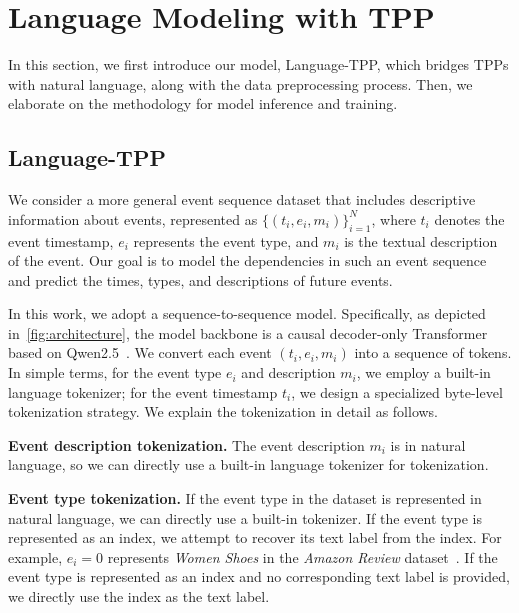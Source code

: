 \section{Language Modeling with TPP}
In this section, we first introduce our model, Language-TPP, which bridges TPPs with natural language, along with the data preprocessing process. Then, we elaborate on the methodology for model inference and training. 

\subsection{Language-TPP}
We consider a more general event sequence dataset that includes descriptive information about events, represented as \(\{(t_i, e_i, m_i)\}_{i=1}^N\), where \(t_i\) denotes the event timestamp, \(e_i\) represents the event type, and \(m_i\) is the textual description of the event. 
Our goal is to model the dependencies in such an event sequence and predict the times, types, and descriptions of future events. 


In this work, we adopt a sequence-to-sequence model. Specifically, as depicted in~\cref{fig:architecture}, the model backbone is a causal decoder-only Transformer based on Qwen2.5~\citep{yang2024qwen2}. 
We convert each event $(t_i, e_i, m_i)$ into a sequence of tokens. 
In simple terms, for the event type \(e_i\) and description \(m_i\), we employ a built-in language tokenizer; for the event timestamp \(t_i\), we design a specialized byte-level tokenization strategy. 
We explain the tokenization in detail as follows. 

\textbf{Event description tokenization.}
The event description $m_i$ is in natural language, so we can directly use a built-in language tokenizer for tokenization. 

\textbf{Event type tokenization.}
If the event type in the dataset is represented in natural language, we can directly use a built-in tokenizer.  
If the event type is represented as an index, we attempt to recover its text label from the index. For example, \(e_i = 0\) represents \textit{Women Shoes} in the \textit{Amazon Review} dataset~\citep{ni2019justifying}.  
If the event type is represented as an index and no corresponding text label is provided, we directly use the index as the text label. 



